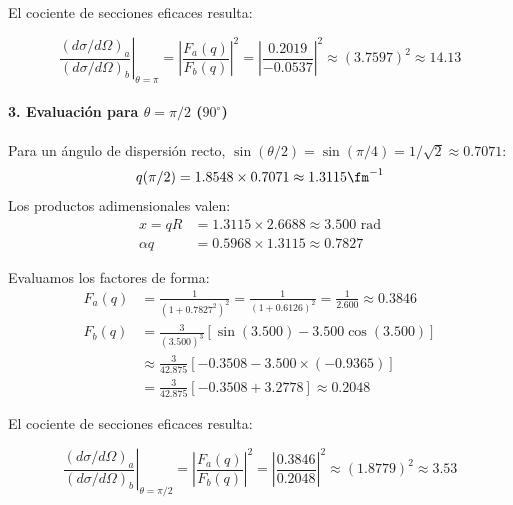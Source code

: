 \begin{problema}
El cociente de secciones eficaces resulta:
\begin{observacion}[Relación de secciones eficaces a $\theta = \pi$]
\begin{equation}
    \left. \frac{(d\sigma/d\Omega)_a}{(d\sigma/d\Omega)_b} \right|_{\theta = \pi} = \left| \frac{F_a(q)}{F_b(q)} \right|^2 = \left| \frac{0.2019}{-0.0537} \right|^2 \approx (3.7597)^2 \approx 14.13
\end{equation}
\end{observacion}

\paragraph{3. Evaluación para $\theta = \pi/2$ ($90^\circ$)}
Para un ángulo de dispersión recto, $\sin(\theta/2) = \sin(\pi/4) = 1/\sqrt{2} \approx 0.7071$:
\begin{equation}
    q(\pi/2) = 1.8548 \times 0.7071 \approx 1.3115 \fm^{-1}
\end{equation}
Los productos adimensionales valen:
\begin{align}
    x = qR &= 1.3115 \times 2.6688 \approx 3.500 \text{ rad} \\
    \alpha q &= 0.5968 \times 1.3115 \approx 0.7827
\end{align}

Evaluamos los factores de forma:
\begin{align}
    F_a(q) &= \frac{1}{(1 + 0.7827^2)^2} = \frac{1}{(1 + 0.6126)^2} = \frac{1}{2.600} \approx 0.3846 \\
    F_b(q) &= \frac{3}{(3.500)^3} \left[ \sin(3.500) - 3.500 \cos(3.500) \right] \nonumber \\
    &\approx \frac{3}{42.875} \left[ -0.3508 - 3.500 \times (-0.9365) \right] \nonumber \\
    &= \frac{3}{42.875} \left[ -0.3508 + 3.2778 \right] \approx 0.2048
\end{align}

El cociente de secciones eficaces resulta:
\begin{observacion}[Relación de secciones eficaces a $\theta = \pi/2$]
\begin{equation}
    \left. \frac{(d\sigma/d\Omega)_a}{(d\sigma/d\Omega)_b} \right|_{\theta = \pi/2} = \left| \frac{F_a(q)}{F_b(q)} \right|^2 = \left| \frac{0.3846}{0.2048} \right|^2 \approx (1.8779)^2 \approx 3.53
\end{equation}
\end{observacion}
\end{problema}